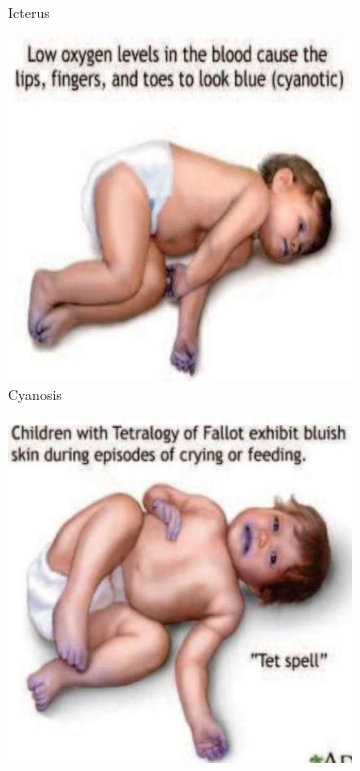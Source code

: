 \documentclass[a4paper,12pt,openany,twoside]{book}
\begin{document}
{\begin{figure}[h]
\begin{subfigure}[t]{.23\textwidth}
																	\caption{Icterus}
																	\label{icterus}
																\end{subfigure}
																\hspace{\fill}
																\begin{subfigure}[t]{.23\textwidth}
																	\centering
																	\includegraphics[width=\textwidth]{./clinicalPhysioPic/cyanosis4-0.jpg}
																	\caption{Cyanosis}
																	\label{cyanosis1}
																\end{subfigure}
																\hspace{\fill}
																\begin{subfigure}[t]{.23\textwidth}
																	\centering
																	\includegraphics[width=\textwidth]{./clinicalPhysioPic/cyanosis4-1.jpg}

\end{subfigure}
\end{figure}}
\end{document}
